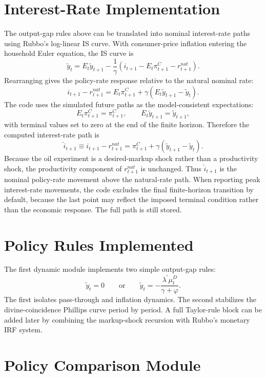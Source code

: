 \documentclass[11pt]{article}
\begin{document}
\section{Interest-Rate Implementation}

The output-gap rules above can be translated into nominal interest-rate paths using
Rubbo's log-linear IS curve. With consumer-price inflation entering the household Euler
equation, the IS curve is
\[
    \tilde y_t
    =
    E_t \tilde y_{t+1}
    -
    \frac{1}{\gamma}
    \left(
        i_{t+1}
        -
        E_t \pi^C_{t+1}
        -
        r^{nat}_{t+1}
    \right).
\]
Rearranging gives the policy-rate response relative to the natural nominal rate:
\[
    i_{t+1}-r^{nat}_{t+1}
    =
    E_t\pi^C_{t+1}
    +
    \gamma
    \left(
        E_t\tilde y_{t+1}-\tilde y_t
    \right).
\]
The code uses the simulated future paths as the model-consistent expectations:
\[
    E_t\pi^C_{t+1} = \pi^C_{t+1},
    \qquad
    E_t\tilde y_{t+1} = \tilde y_{t+1},
\]
with terminal values set to zero at the end of the finite horizon. Therefore the
computed interest-rate path is
\[
    \widehat i_{t+1}
    \equiv
    i_{t+1}-r^{nat}_{t+1}
    =
    \pi^C_{t+1}
    +
    \gamma
    \left(
        \tilde y_{t+1}-\tilde y_t
    \right).
\]
Because the oil experiment is a desired-markup shock rather than a productivity shock,
the productivity component of $r^{nat}_{t+1}$ is unchanged. Thus $\widehat i_{t+1}$
is the nominal policy-rate movement above the natural-rate path.
When reporting peak interest-rate movements, the code excludes the final finite-horizon
transition by default, because the last point may reflect the imposed terminal condition
rather than the economic response. The full path is still stored.

\section{Policy Rules Implemented}

The first dynamic module implements two simple output-gap rules:
\[
    \tilde y_t = 0
    \qquad \text{or} \qquad
    \tilde y_t = -\frac{\lambda^\prime \mu_t^D}{\gamma+\varphi}.
\]
The first isolates pass-through and inflation dynamics. The second stabilizes the
divine-coincidence Phillips curve period by period. A full Taylor-rule block can be
added later by combining the markup-shock recursion with Rubbo's monetary IRF
system.

\section{Policy Comparison Module}
\end{document}
